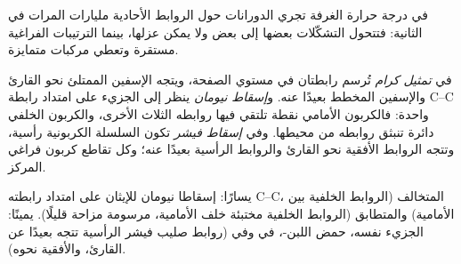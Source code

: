 في درجة حرارة الغرفة تجري الدورانات حول الروابط الأحادية مليارات
المرات في الثانية: فتتحول التشكّلات بعضها إلى بعض ولا يمكن عزلها، بينما
الترتيبات الفراغية مستقرة وتعطي مركبات متمايزة.

\begin{definition}\label{def:b1:stereochemistry-in-depth:representations}
في \emph{تمثيل كرام} تُرسم رابطتان
في مستوي الصفحة، ويتجه الإسفين الممتلئ نحو
القارئ والإسفين المخطط بعيدًا عنه. و\emph{إسقاط نيومان}
ينظر إلى الجزيء على امتداد رابطة C--C واحدة: فالكربون الأمامي
نقطة تلتقي فيها روابطه الثلاث الأخرى، والكربون الخلفي دائرة تنبثق
روابطه من محيطها. وفي \emph{إسقاط فيشر}
تكون السلسلة الكربونية رأسية، وتتجه الروابط الأفقية نحو
القارئ والروابط الرأسية بعيدًا عنه؛ وكل تقاطع كربون فراغي المركز.
\end{definition}

\begin{omfigure}

{\small يسارًا: إسقاطا نيومان للإيثان على امتداد رابطته C--C، المتخالف
(الروابط الخلفية بين الأمامية) والمتطابق (الروابط الخلفية مختبئة
خلف الأمامية، مرسومة مزاحة قليلًا). يمينًا: الجزيء نفسه،
حمض اللبن-، في  وفي 
(روابط صليب فيشر الرأسية تتجه بعيدًا عن القارئ،
والأفقية نحوه).}
\end{omfigure}


